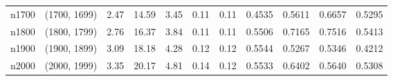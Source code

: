 \begin{tabular}{llrrrrrrrrr}
   n1700 & (1700, 1699) &  2.47 & 14.59 & 3.45 &  0.11 &   0.11 &   0.4535 &   0.5611 &     0.6657 &      0.5295 \\
   n1800 & (1800, 1799) &  2.76 & 16.37 & 3.84 &  0.11 &   0.11 &   0.5506 &   0.7165 &     0.7516 &      0.5413 \\
   n1900 & (1900, 1899) &  3.09 & 18.18 & 4.28 &  0.12 &   0.12 &   0.5544 &   0.5267 &     0.5346 &      0.4212 \\
   n2000 & (2000, 1999) &  3.35 & 20.17 & 4.81 &  0.14 &   0.12 &   0.5533 &   0.6402 &     0.5640 &      0.5308 \\
\bottomrule
\end{tabular}
